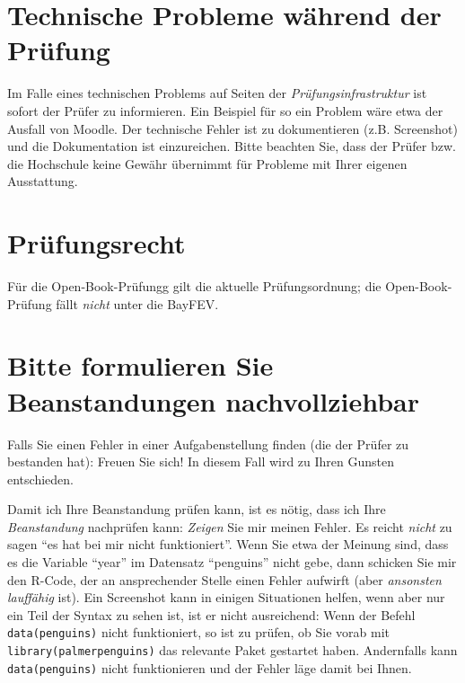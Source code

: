 \documentclass[
  a4paper,
  DIV=11]{scrreprt}
\theoremstyle{definition}
\theoremstyle{remark}
\begin{document}
\hypertarget{technische-probleme-wuxe4hrend-der-pruxfcfung}{%
\section{Technische Probleme während der
Prüfung}\label{technische-probleme-wuxe4hrend-der-pruxfcfung}}

Im Falle eines technischen Problems auf Seiten der
\emph{Prüfungsinfrastruktur} ist sofort der Prüfer zu informieren. Ein
Beispiel für so ein Problem wäre etwa der Ausfall von Moodle. Der
technische Fehler ist zu dokumentieren (z.B. Screenshot) und die
Dokumentation ist einzureichen. Bitte beachten Sie, dass der Prüfer bzw.
die Hochschule keine Gewähr übernimmt für Probleme mit Ihrer eigenen
Ausstattung.

\hypertarget{pruxfcfungsrecht}{%
\section{Prüfungsrecht}\label{pruxfcfungsrecht}}

Für die Open-Book-Prüfungg gilt die aktuelle Prüfungsordnung; die
Open-Book-Prüfung fällt \emph{nicht} unter die BayFEV.

\hypertarget{bitte-formulieren-sie-beanstandungen-nachvollziehbar}{%
\section{Bitte formulieren Sie Beanstandungen
nachvollziehbar}\label{bitte-formulieren-sie-beanstandungen-nachvollziehbar}}

Falls Sie einen Fehler in einer Aufgabenstellung finden (die der Prüfer
zu bestanden hat): Freuen Sie sich! In diesem Fall wird zu Ihren Gunsten
entschieden.

Damit ich Ihre Beanstandung prüfen kann, ist es nötig, dass ich Ihre
\emph{Beanstandung} nachprüfen kann: \emph{Zeigen} Sie mir meinen
Fehler. Es reicht \emph{nicht} zu sagen ``es hat bei mir nicht
funktioniert''. Wenn Sie etwa der Meinung sind, dass es die Variable
``year'' im Datensatz ``penguins'' nicht gebe, dann schicken Sie mir den
R-Code, der an ansprechender Stelle einen Fehler aufwirft (aber
\emph{ansonsten lauffähig} ist). Ein Screenshot kann in einigen
Situationen helfen, wenn aber nur ein Teil der Syntax zu sehen ist, ist
er nicht ausreichend: Wenn der Befehl \texttt{data(penguins)} nicht
funktioniert, so ist zu prüfen, ob Sie vorab mit
\texttt{library(palmerpenguins)} das relevante Paket gestartet haben.
Andernfalls kann \texttt{data(penguins)} nicht funktionieren und der
Fehler läge damit bei Ihnen.
\end{document}
